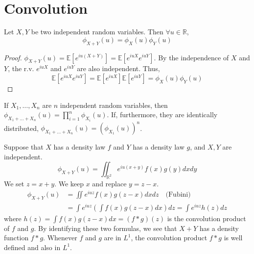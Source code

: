 \section{Convolution}%
\begin{lemma}
Let $X, Y$ be two independent random variables. Then $\forall u \in \mathbb{R}$,
\[ \phi_{X+Y}(u) = \phi_X(u) \phi_Y(u) \]
\end{lemma}%
\begin{proof}
$\phi_{X+Y}(u) = \mathbb{E}[e^{iu(X+Y)}] = \mathbb{E}[e^{iuX} e^{iuY}]$. By the independence of $X$ and $Y$, the r.v. $e^{iuX}$ and $e^{iuY}$ are also independent. Thus,
\[ \mathbb{E}[e^{iuX} e^{iuY}] = \mathbb{E}[e^{iuX}] \mathbb{E}[e^{iuY}] = \phi_X(u) \phi_Y(u) \]
\end{proof}%
\begin{corollary}
If $X_1, \dots, X_n$ are $n$ independent random variables, then $\phi_{X_1+\dots+X_n}(u) = \prod_{i=1}^n \phi_{X_i}(u)$.
If, furthermore, they are identically distributed, $\phi_{X_1+\dots+X_n}(u) = (\phi_{X_1}(u))^n$.
\end{corollary}%
Suppose that $X$ has a density law $f$ and $Y$ has a density law $g$, and $X,Y$ are independent.
\[ \phi_{X+Y}(u) = \iint_{\mathbb{R}^2} e^{iu(x+y)} f(x)g(y) dx dy \]
We set $z=x+y$. We keep $x$ and replace $y=z-x$.%
\begin{align*}
    \phi_{X+Y}(u) &= \iint e^{iuz} f(x)g(z-x) dx dz \quad \text{(Fubini)} \\
    &= \int e^{iuz} \left( \int f(x)g(z-x) dx \right) dz = \int e^{iuz} h(z) dz
\end{align*}%
where $h(z) = \int f(x)g(z-x) dx = (f*g)(z)$ is the convolution product of $f$ and $g$.
By identifying these two formulas, we see that $X+Y$ has a density function $f*g$.
Whenever $f$ and $g$ are in $L^1$, the convolution product $f*g$ is well defined and also in $L^1$.%

